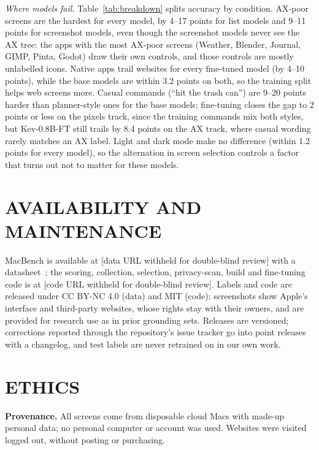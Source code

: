 \documentclass[a4paper,twoside]{article}
\newcommand{\bench}{MacBench}
\newcommand{\anonurl}[1]{[#1 URL withheld for double-blind review]}
\begin{document}
\emph{Where models fail.} Table~\ref{tab:breakdown} splits accuracy by condition. AX-poor screens are the hardest for every model, by 4--17 points for list models and 9--11 points for screenshot models, even though the screenshot models never see the AX tree: the apps with the most AX-poor screens (Weather, Blender, Journal, GIMP, Pinta, Godot) draw their own controls, and those controls are mostly unlabelled icons. Native apps trail websites for every fine-tuned model (by 4--10 points), while the base models are within 3.2 points on both, so the training split helps web screens more. Casual commands (``hit the trash can'') are 9--20 points harder than planner-style ones for the base models; fine-tuning closes the gap to 2 points or less on the pixels track, since the training commands mix both styles, but Kev-0.8B-FT still trails by 8.4 points on the AX track, where casual wording rarely matches an AX label. Light and dark mode make no difference (within 1.2 points for every model), so the alternation in screen selection controls a factor that turns out not to matter for these models.

\section{\uppercase{Availability and Maintenance}}
\bench{} is available at \anonurl{data} with a datasheet~\cite{datasheets}; the scoring, collection, selection, privacy-scan, build and fine-tuning code is at \anonurl{code}. Labels and code are released under CC BY-NC 4.0 (data) and MIT (code); screenshots show Apple's interface and third-party websites, whose rights stay with their owners, and are provided for research use as in prior grounding sets. Releases are versioned; corrections reported through the repository's issue tracker go into point releases with a changelog, and test labels are never retrained on in our own work.

\section{\uppercase{Ethics}}
\textbf{Provenance.} All screens come from disposable cloud Macs with made-up personal data; no personal computer or account was used. Websites were visited logged out, without posting or purchasing.
\end{document}
